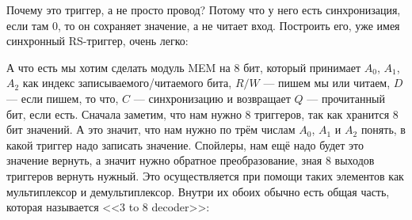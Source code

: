 \documentclass{article}
\begin{document}
    Почему это триггер, а не просто провод? Потому что у него есть синхронизация, если там $0$, то он сохраняет значение, а не читает вход. Построить его, уже имея синхронный RS-триггер, очень легко:
    \begin{center}\end{center}
    А что есть мы хотим сделать модуль MEM на 8 бит, который принимает $A_0$, $A_1$, $A_2$ как индекс записываемого/читаемого бита, $R/W$ --- пишем мы или читаем, $D$ --- если пишем, то что, $C$ --- синхронизацию и возвращает $Q$ --- прочитанный бит, если есть. Сначала заметим, что нам нужно 8 триггеров, так как хранится 8 бит значений. А это значит, что нам нужно по трём числам $A_0$, $A_1$ и $A_2$ понять, в какой триггер надо записать значение. Спойлеры, нам ещё надо будет это значение вернуть, а значит нужно обратное преобразование, зная 8 выходов триггеров вернуть нужный. Это осуществляется при помощи таких элементов как мультиплексор и демультиплексор. Внутри их обоих обычно есть общая часть, которая называется <<3 to 8 decoder>>:
\end{document}
